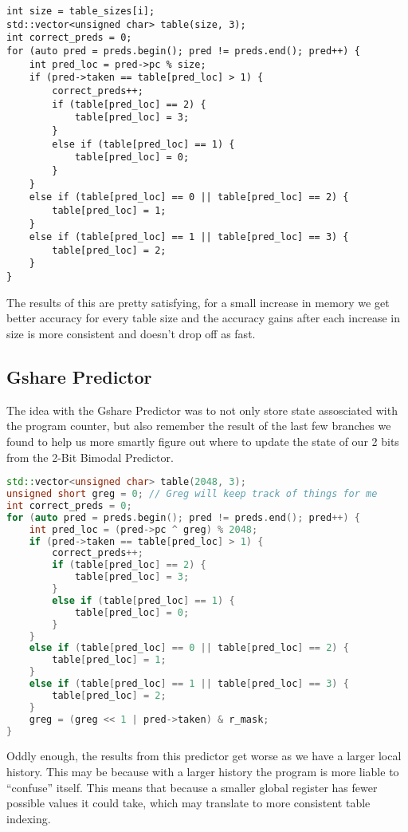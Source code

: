 \documentclass[12pt]{article}
\begin{document}
\begin{lstlisting}[languag=C++, caption=A few more conditions, but the same idea]
int size = table_sizes[i];
std::vector<unsigned char> table(size, 3);
int correct_preds = 0;
for (auto pred = preds.begin(); pred != preds.end(); pred++) {
    int pred_loc = pred->pc % size;
    if (pred->taken == table[pred_loc] > 1) {
        correct_preds++;
        if (table[pred_loc] == 2) {
            table[pred_loc] = 3;
        }
        else if (table[pred_loc] == 1) {
            table[pred_loc] = 0;
        }
    }
    else if (table[pred_loc] == 0 || table[pred_loc] == 2) {
        table[pred_loc] = 1;
    }
    else if (table[pred_loc] == 1 || table[pred_loc] == 3) {
        table[pred_loc] = 2;
    }
}
\end{lstlisting}

The results of this are pretty satisfying, for a small increase in memory we get
better accuracy for every table size and the accuracy gains after each increase
in size is more consistent and doesn't drop off as fast.

\subsection{Gshare Predictor}
\label{subsec:label}

The idea with the Gshare Predictor was to not only store state assosciated with
the program counter, but also remember the result of the last few branches we
found to help us more smartly figure out where to update the state of our 2 bits
from the 2-Bit Bimodal Predictor.

\begin{lstlisting}[language=C++, caption=Thanks Greg]
std::vector<unsigned char> table(2048, 3);
unsigned short greg = 0; // Greg will keep track of things for me
int correct_preds = 0;
for (auto pred = preds.begin(); pred != preds.end(); pred++) {
    int pred_loc = (pred->pc ^ greg) % 2048;
    if (pred->taken == table[pred_loc] > 1) {
        correct_preds++;
        if (table[pred_loc] == 2) {
            table[pred_loc] = 3;
        }
        else if (table[pred_loc] == 1) {
            table[pred_loc] = 0;
        }
    }
    else if (table[pred_loc] == 0 || table[pred_loc] == 2) {
        table[pred_loc] = 1;
    }
    else if (table[pred_loc] == 1 || table[pred_loc] == 3) {
        table[pred_loc] = 2;
    }
    greg = (greg << 1 | pred->taken) & r_mask;
}
\end{lstlisting}

Oddly enough, the results from this predictor get worse as we have a larger
local history. This may be because with a larger history the program is more
liable to ``confuse'' itself. This means that because a smaller global register
has fewer possible values it could take, which may translate to more consistent
table indexing.
\end{document}
